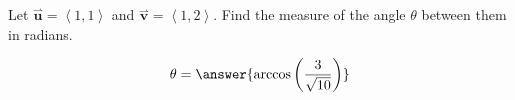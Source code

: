 \documentclass{ximera}
\author{Gregory Hartman \and Matthew Carr}
\begin{document}
\begin{exercise}
Let $\overset{\boldsymbol{\rightharpoonup}}{\mathbf{u}} = \left< 1,1 \right>$ and $\overset{\boldsymbol{\rightharpoonup}}{\mathbf{v}} = \left< 1,2 \right>$. Find the
measure of the angle $\theta$ between them in radians.
\begin{prompt}
\[
\theta=\answer{\arccos\left(\frac{3}{\sqrt{10}}\right)}
\]
\end{prompt}
\end{exercise}
\end{document}
